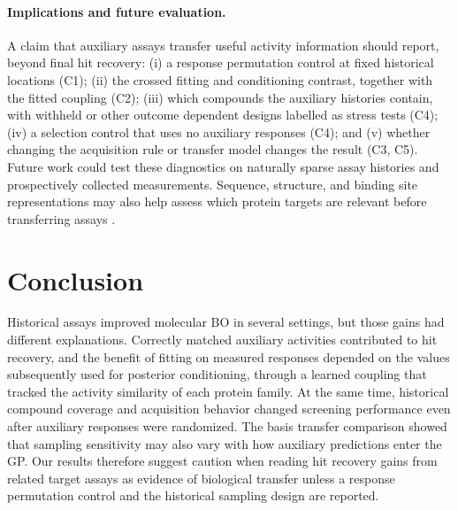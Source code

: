 \documentclass[10pt,letterpaper,runningheads]{llncs}
\begin{document}
\paragraph{Implications and future evaluation.}
A claim that auxiliary assays transfer useful activity information
should report, beyond final hit recovery:
(i) a response permutation control at fixed historical locations (C1);
(ii) the crossed fitting and conditioning contrast, together with the
fitted coupling (C2);
(iii) which compounds the auxiliary histories contain, with withheld
or other outcome dependent designs labelled as stress tests (C4);
(iv) a selection control that uses no auxiliary responses (C4); and
(v) whether changing the acquisition rule or transfer model changes the
result (C3, C5).
Future work could test these diagnostics on naturally sparse assay
histories and prospectively collected measurements. Sequence,
structure, and binding site representations may also help assess
which protein targets are relevant before transferring assays
\cite{vanwesten2011pcm,cortesciriano2015pcm}.

\section{Conclusion}
\label{sec:conclusion}

Historical assays improved molecular BO in several settings, but
those gains had different explanations. Correctly matched auxiliary
activities contributed to hit recovery, and the benefit of fitting
on measured responses depended on the values subsequently used for
posterior conditioning, through a learned coupling that tracked the
activity similarity of each protein family. At the same time, historical compound
coverage and acquisition behavior changed screening performance
even after auxiliary responses were randomized. The basis transfer
comparison showed that sampling sensitivity may also vary with how
auxiliary predictions enter the GP. Our results therefore suggest
caution when reading hit recovery gains from related target assays as
evidence of biological transfer unless a response permutation control
and the historical sampling design are reported.


\clearpage
\label{page:references-start}



\end{document}
